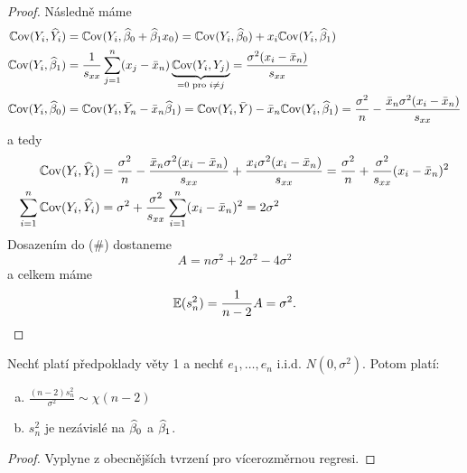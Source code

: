 \begin{proof}
	Následně máme
	\begin{align*}
	\mathbb{C}\mathrm{ov}(Y_i, \widehat{Y}_i) & = \mathbb{C}\mathrm{ov}(Y_i, \widehat{\beta}_0 + \widehat{\beta}_1 x_0) = \mathbb{C}\mathrm{ov}(Y_i, \widehat{\beta}_0) + x_i \mathbb{C}\mathrm{ov}(Y_i, \widehat{\beta}_1) \\
	\mathbb{C}\mathrm{ov}(Y_i, \widehat{\beta}_1) & = \frac{1}{s_{xx}} \sum_{j=1}^{n} (x_j - \bar{x}_n) \underbrace{\mathbb{C}\mathrm{ov}(Y_i, Y_j)}_{= 0 \text{ pro } i \neq j} = \frac{\sigma^2(x_i - \bar{x}_n)}{s_{xx}} \\
	\mathbb{C}\mathrm{ov}(Y_i, \widehat{\beta}_0) & = \mathbb{C}\mathrm{ov}(Y_i, \bar{Y}_n - \bar{x}_n \widehat{\beta}_1) = \mathbb{C}\mathrm{ov}(Y_i, \bar{Y}) - \bar{x}_n \mathbb{C}\mathrm{ov}(Y_i, \widehat{\beta}_1) = \frac{\sigma^2}{n} - \frac{\bar{x}_n \sigma^2 (x_i - \bar{x}_n)}{s_{xx}} \\
	\end{align*}
	a tedy
	\begin{align*}
		\mathbb{C}\mathrm{ov}(Y_i, \widehat{Y}_i) & = \frac{\sigma^2}{n} - \frac{\bar{x}_n \sigma^2 (x_i - \bar{x}_n)}{s_{xx}} + \frac{x_i \sigma^2 (x_i - \bar{x}_n)}{s_{xx}} = \frac{\sigma^2}{n} + \frac{\sigma^2}{s_{xx}}(x_i - \bar{x}_n)^2 \\
		\sum_{i=1}^n \mathbb{C}\mathrm{ov}(Y_i, \widehat{Y}_i) & = \sigma^2 + \frac{\sigma^2}{s_{xx}} \sum_{i=1}^n (x_i - \bar{x}_n)^2 = 2 \sigma^2 \\
	\end{align*}
	Dosazením do ($\#$) dostaneme
	\begin{equation*}
		A  = n\sigma^2 + 2\sigma^2 - 4\sigma^2
	\end{equation*}
	a celkem máme
	\begin{equation*}
		\mathbb{E}(s_n^2)  = \frac{1}{n-2} A = \sigma^2.
	\end{equation*}
\end{proof}

\begin{corollary}
	Nechť platí předpoklady věty 1 a nechť $e_1, \dots, e_n$ i.i.d. $N(0,\sigma^2)$. Potom platí:
	\begin{enumerate}[a)]
		\item $\frac{(n-2)s_n^2}{\sigma^2} \sim \chi(n-2)$
		\item $s_n^2$ je nezávislé na $\widehat{\beta}_0$ a $\widehat{\beta}_1$.
	\end{enumerate}
\end{corollary}

\begin{proof}
	Vyplyne z obecnějších tvrzení pro vícerozměrnou regresi.
\end{proof}

